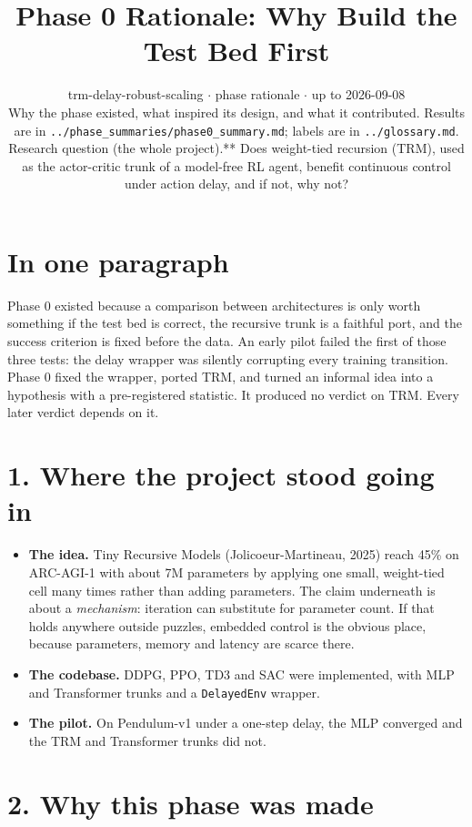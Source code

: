 \documentclass[11pt]{article}
\title{Phase 0 Rationale: Why Build the Test Bed First}
\author{}
\date{trm-delay-robust-scaling $\cdot$ phase rationale $\cdot$ up to 2026-09-08\\[2pt]Why the phase existed, what inspired its design, and what it contributed. Results are in \texttt{.\allowbreak{}.\allowbreak{}/\allowbreak{}phase\_\allowbreak{}summaries/\allowbreak{}phase0\_\allowbreak{}summary.\allowbreak{}md}; labels are in \texttt{.\allowbreak{}.\allowbreak{}/\allowbreak{}glossary.\allowbreak{}md}.\\[2pt]Research question (the whole project).** Does weight-tied recursion (TRM), used as the actor-critic trunk of a model-free RL agent, benefit continuous control under action delay, and if not, why not?}
\begin{document}
\maketitle
\section*{In one paragraph}



Phase 0 existed because a comparison between architectures is only worth something if the test bed is correct, the recursive trunk is a faithful port, and the success criterion is fixed before the data. An early pilot failed the first of those three tests: the delay wrapper was silently corrupting every training transition. Phase 0 fixed the wrapper, ported TRM, and turned an informal idea into a hypothesis with a pre-registered statistic. It produced no verdict on TRM. Every later verdict depends on it.



\section*{1. Where the project stood going in}



\begin{itemize}
\item \textbf{The idea.} Tiny Recursive Models (Jolicoeur-Martineau, 2025) reach 45\% on ARC-AGI-1 with about 7M parameters by applying one small, weight-tied cell many times rather than adding parameters. The claim underneath is about a \emph{mechanism}: iteration can substitute for parameter count. If that holds anywhere outside puzzles, embedded control is the obvious place, because parameters, memory and latency are scarce there.
\item \textbf{The codebase.} DDPG, PPO, TD3 and SAC were implemented, with MLP and Transformer trunks and a \texttt{DelayedEnv} wrapper.
\item \textbf{The pilot.} On Pendulum-v1 under a one-step delay, the MLP converged and the TRM and Transformer trunks did not.
\end{itemize}



\section*{2. Why this phase was made}
\end{document}
